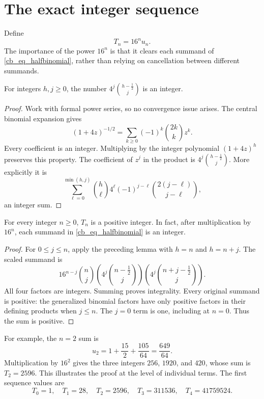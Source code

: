\section{The exact integer sequence}

Define
\begin{equation}\label{cb_eq_T_def}
 T_n=16^nu_n.
\end{equation}
The importance of the power $16^n$ is that it clears each summand of
\eqref{cb_eq_halfbinomial}, rather than relying on cancellation between
different summands.

\begin{lemma}\label{cb_lem_half_denom}
For integers $h,j\geq0$, the number
$4^j\binom{h-\tfrac12}{j}$ is an integer.
\end{lemma}

\begin{proof}
Work with formal power series, so no convergence issue arises. The central
binomial expansion gives
\[
 (1+4z)^{-1/2}=\sum_{k\geq0}(-1)^k\binom{2k}{k}z^k.
\]
Every coefficient is an integer. Multiplying by the integer polynomial
$(1+4z)^h$ preserves this property. The coefficient of $z^j$ in the product
is $4^j\binom{h-\tfrac12}{j}$. More explicitly it is
\[
 \sum_{\ell=0}^{\min(h,j)}
 \binom h\ell 4^\ell(-1)^{j-\ell}
 \binom{2(j-\ell)}{j-\ell},
\]
an integer sum.
\end{proof}

\begin{theorem}\label{cb_thm_T_integer}
For every integer $n\geq0$, $T_n$ is a positive integer. In fact, after
multiplication by $16^n$, each summand in
\eqref{cb_eq_halfbinomial} is an integer.
\end{theorem}

\begin{proof}
For $0\leq j\leq n$, apply the preceding lemma with $h=n$ and $h=n+j$.
The scaled summand is
\[
 16^{n-j}\binom nj
 \left(4^j\binom{n-\tfrac12}{j}\right)
 \left(4^j\binom{n+j-\tfrac12}{j}\right).
\]
All four factors are integers. Summing proves integrality. Every original
summand is positive: the generalized binomial factors have only positive
factors in their defining products when $j\leq n$. The $j=0$ term is one,
including at $n=0$. Thus the sum is positive.
\end{proof}

For example, the $n=2$ sum is
\[
 u_2=1+\frac{15}{2}+\frac{105}{64}=\frac{649}{64}.
\]
Multiplication by $16^2$ gives the three integers $256$, $1920$, and $420$,
whose sum is $T_2=2596$. This illustrates the proof at the level of individual
terms. The first sequence values are
\[
 T_0=1,\quad T_1=28,\quad T_2=2596,\quad
 T_3=311536,\quad T_4=41759524.
\]


